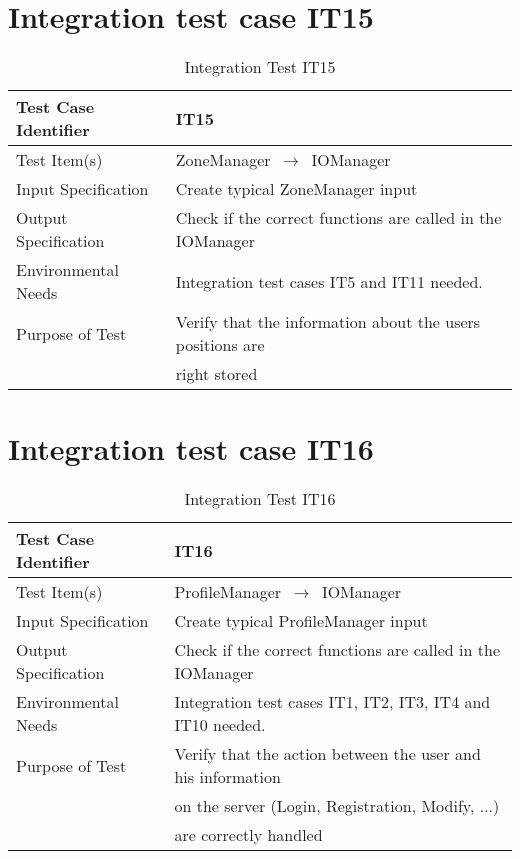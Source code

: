 \documentclass[../../testPlan.tex]{subfiles}
\begin{document}
		
		
	\section{Integration test case IT15}
		\begin{table}[H]
			\centering
			\label{IT15}
			\begin{tabular}{ll}
				\hline
				Test Case Identifier & IT15 \\ \hline
				Test Item(s)         & ZoneManager $\,\to\,$ IOManager\\ \hline
				Input Specification  & Create typical ZoneManager input  \\ \hline
				Output Specification & Check if the correct functions are called in the IOManager\\ \hline
				Environmental Needs  &  Integration test cases IT5 and IT11 needed. \\ \hline
				Purpose of Test      &  Verify that the information about the users positions are \\ & right stored  \\ \hline
			\end{tabular}
			\caption{Integration Test IT15}
		\end{table}
	
	
	
	\section{Integration test case IT16}
		\begin{table}[H]
			\centering
			\label{IT16}
			\begin{tabular}{ll}
				\hline
				Test Case Identifier & IT16 \\ \hline
				Test Item(s)         & ProfileManager $\,\to\,$ IOManager\\ \hline
				Input Specification  & Create typical ProfileManager input  \\ \hline
				Output Specification & Check if the correct functions are called in the IOManager\\ \hline
				Environmental Needs  &  Integration test cases IT1, IT2, IT3, IT4 and IT10 needed. \\ \hline
				Purpose of Test      &  Verify that the action between the user and his information \\ & on the server (Login, Registration, Modify, ...) \\ & are correctly handled  \\ \hline
			\end{tabular}
			\caption{Integration Test IT16}
		\end{table}
		
\end{document}
